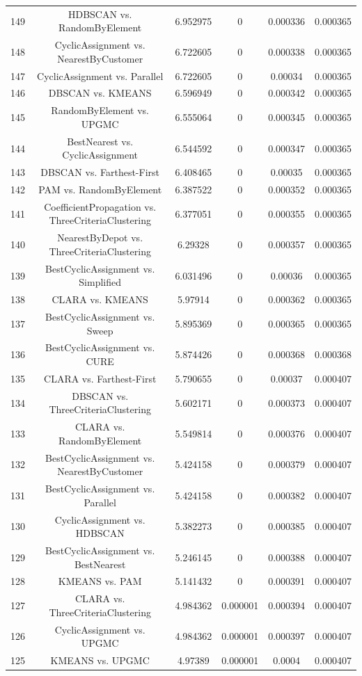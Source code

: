 \documentclass[a4paper,10pt]{article}
\begin{document}
\begin{landscape}
\begin{table}[!htp]
\begin{tabular}{cccccc}
149&HDBSCAN vs. RandomByElement&6.952975&0&0.000336&0.000365\\
148&CyclicAssignment vs. NearestByCustomer&6.722605&0&0.000338&0.000365\\
147&CyclicAssignment vs. Parallel&6.722605&0&0.00034&0.000365\\
146&DBSCAN vs. KMEANS&6.596949&0&0.000342&0.000365\\
145&RandomByElement vs. UPGMC&6.555064&0&0.000345&0.000365\\
144&BestNearest vs. CyclicAssignment&6.544592&0&0.000347&0.000365\\
143&DBSCAN vs. Farthest-First&6.408465&0&0.00035&0.000365\\
142&PAM vs. RandomByElement&6.387522&0&0.000352&0.000365\\
141&CoefficientPropagation vs. ThreeCriteriaClustering&6.377051&0&0.000355&0.000365\\
140&NearestByDepot vs. ThreeCriteriaClustering&6.29328&0&0.000357&0.000365\\
139&BestCyclicAssignment vs. Simplified&6.031496&0&0.00036&0.000365\\
138&CLARA vs. KMEANS&5.97914&0&0.000362&0.000365\\
137&BestCyclicAssignment vs. Sweep&5.895369&0&0.000365&0.000365\\
136&BestCyclicAssignment vs. CURE&5.874426&0&0.000368&0.000368\\
135&CLARA vs. Farthest-First&5.790655&0&0.00037&0.000407\\
134&DBSCAN vs. ThreeCriteriaClustering&5.602171&0&0.000373&0.000407\\
133&CLARA vs. RandomByElement&5.549814&0&0.000376&0.000407\\
132&BestCyclicAssignment vs. NearestByCustomer&5.424158&0&0.000379&0.000407\\
131&BestCyclicAssignment vs. Parallel&5.424158&0&0.000382&0.000407\\
130&CyclicAssignment vs. HDBSCAN&5.382273&0&0.000385&0.000407\\
129&BestCyclicAssignment vs. BestNearest&5.246145&0&0.000388&0.000407\\
128&KMEANS vs. PAM&5.141432&0&0.000391&0.000407\\
127&CLARA vs. ThreeCriteriaClustering&4.984362&0.000001&0.000394&0.000407\\
126&CyclicAssignment vs. UPGMC&4.984362&0.000001&0.000397&0.000407\\
125&KMEANS vs. UPGMC&4.97389&0.000001&0.0004&0.000407\\

\end{tabular}
\end{table}
\end{landscape}
\end{document}

